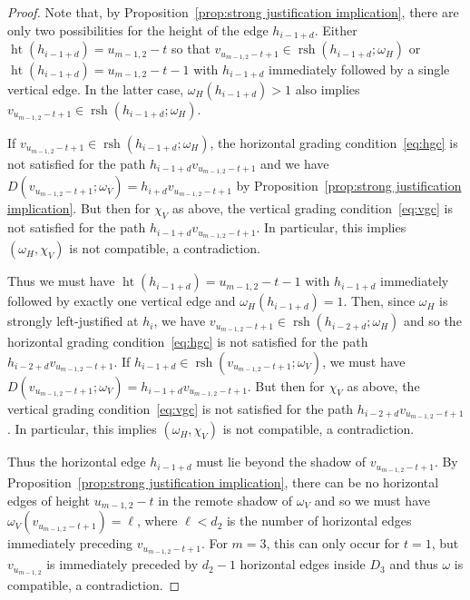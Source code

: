 \documentclass[10pt]{amsart}
\theoremstyle{definition}
\DeclareMathOperator{\hgt}{ht}
\DeclareMathOperator{\rsh}{rsh}
\begin{document}
\begin{proof}
 Note that, by Proposition~\ref{prop:strong justification implication}, there are only two possibilities for the height of the edge $h_{i-1+d}$.
 Either $\hgt(h_{i-1+d})=u_{m-1,2}-t$ so that $v_{u_{m-1,2}-t+1}\in\rsh(h_{i-1+d};\omega_H)$ or $\hgt(h_{i-1+d})=u_{m-1,2}-t-1$ with $h_{i-1+d}$ immediately followed by a single vertical edge.
 In the latter case, $\omega_H(h_{i-1+d})>1$ also implies $v_{u_{m-1,2}-t+1}\in\rsh(h_{i-1+d};\omega_H)$.

 If $v_{u_{m-1,2}-t+1}\in\rsh(h_{i-1+d};\omega_H)$, the horizontal grading condition~\eqref{eq:hgc} is not satisfied for the path $h_{i-1+d}v_{u_{m-1,2}-t+1}$ and we have $D(v_{u_{m-1,2}-t+1};\omega_V)=h_{i+d}v_{u_{m-1,2}-t+1}$ by Proposition~\ref{prop:strong justification implication}.
 But then for $\chi_V$ as above, the vertical grading condition~\eqref{eq:vgc} is not satisfied for the path $h_{i-1+d}v_{u_{m-1,2}-t+1}$.
 In particular, this implies $(\omega_H,\chi_V)$ is not compatible, a contradiction.

 Thus we must have $\hgt(h_{i-1+d})=u_{m-1,2}-t-1$ with $h_{i-1+d}$ immediately followed by exactly one vertical edge and $\omega_H(h_{i-1+d})=1$.
 Then, since $\omega_H$ is strongly left-justified at $h_i$, we have $v_{u_{m-1,2}-t+1}\in\rsh(h_{i-2+d};\omega_H)$ and so the horizontal grading condition~\eqref{eq:hgc} is not satisfied for the path $h_{i-2+d}v_{u_{m-1,2}-t+1}$.
 If $h_{i-1+d}\in\rsh(v_{u_{m-1,2}-t+1};\omega_V)$, we must have $D(v_{u_{m-1,2}-t+1};\omega_V)=h_{i-1+d}v_{u_{m-1,2}-t+1}$.
 But then for $\chi_V$ as above, the vertical grading condition~\eqref{eq:vgc} is not satisfied for the path $h_{i-2+d}v_{u_{m-1,2}-t+1}$.
 In particular, this implies $(\omega_H,\chi_V)$ is not compatible, a contradiction.

 Thus the horizontal edge $h_{i-1+d}$ must lie beyond the shadow of $v_{u_{m-1,2}-t+1}$.
 By Proposition~\ref{prop:strong justification implication}, there can be no horizontal edges of height $u_{m-1,2}-t$ in the remote shadow of $\omega_V$ and so we must have $\omega_V(v_{u_{m-1,2}-t+1})=\ell$, where $\ell<d_2$ is the number of horizontal edges immediately preceding $v_{u_{m-1,2}-t+1}$. 
 For $m=3$, this can only occur for $t=1$, but $v_{u_{m-1,2}}$ is immediately preceded by $d_2-1$ horizontal edges inside $D_3$ and thus $\omega$ is compatible, a contradiction.


\end{proof}
\end{document}
